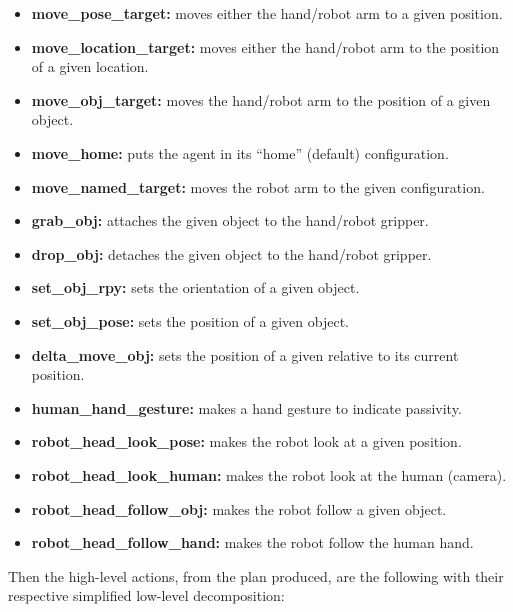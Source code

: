 \begin{itemize}
    \itemsep0em
    \item \textbf{move\_pose\_target:}          moves either the hand/robot arm to a given position.
    \item \textbf{move\_location\_target:}      moves either the hand/robot arm to the position of a given location.
    \item \textbf{move\_obj\_target:}           moves the hand/robot arm to the position of a given object.
    \item \textbf{move\_home:}                  puts the agent in its ``home'' (default) configuration. 
    \item \textbf{move\_named\_target:}         moves the robot arm to the given configuration.
    \item \textbf{grab\_obj:}                   attaches the given object to the hand/robot gripper. 
    \item \textbf{drop\_obj:}                   detaches the given object to the hand/robot gripper.
    \item \textbf{set\_obj\_rpy:}               sets the orientation of a given object.
    \item \textbf{set\_obj\_pose:}              sets the position of a given object.
    \item \textbf{delta\_move\_obj:}            sets the position of a given relative to its current position.
    \item \textbf{human\_hand\_gesture:}        makes a hand gesture to indicate passivity.
    \item \textbf{robot\_head\_look\_pose:}     makes the robot look at a given position.
    \item \textbf{robot\_head\_look\_human:}    makes the robot look at the human (camera).
    \item \textbf{robot\_head\_follow\_obj:}    makes the robot follow a given object.
    \item \textbf{robot\_head\_follow\_hand:}   makes the robot follow the human hand.
\end{itemize}

Then the high-level actions, from the plan produced, are the following with their respective simplified low-level decomposition:

